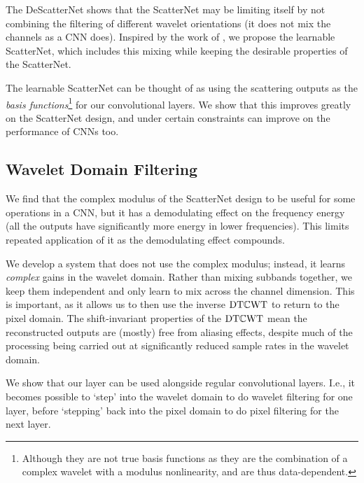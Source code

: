 The DeScatterNet shows that the ScatterNet may be limiting itself by not
combining the filtering of different wavelet orientations (it does not mix the
channels as a CNN does). Inspired by the work of \cite{qiu_dcfnet:_2018}, we
propose the learnable ScatterNet, which includes this mixing while keeping the
desirable properties of the ScatterNet.

The learnable ScatterNet can be thought of as using the scattering outputs as
the \emph{basis functions}\footnote{Although they are not true basis functions
as they are the combination of a complex wavelet with a modulus nonlinearity,
and are thus data-dependent.} for our convolutional layers. We show that this
improves greatly on the ScatterNet design, and under certain constraints can
improve on the performance of CNNs too.

\subsection{Wavelet Domain Filtering}
We find that the complex modulus of the ScatterNet design to be useful for some
operations in a CNN, but it has a demodulating effect on the frequency energy
(all the outputs have significantly more energy in lower frequencies). This
limits repeated application of it as the demodulating effect compounds.

We develop a system that does not use the complex modulus; instead, it
learns \emph{complex} gains in the wavelet domain.
Rather than mixing subbands together, we keep them independent and only learn to
mix across the channel dimension. This is important, as it allows us to then use the inverse
$\mathrm{DT}\mathbb{C}\mathrm{WT}$ to return to the pixel domain. The shift-invariant properties of the $\mathrm{DT}\mathbb{C}\mathrm{WT}$ mean the
reconstructed outputs are (mostly) free from aliasing effects, despite much of
the processing being carried out at significantly reduced sample rates in the
wavelet domain.

We show that our layer can be used alongside regular convolutional
layers. I.e., it becomes possible to `step' into the wavelet domain to do
wavelet filtering for one layer, before `stepping' back into the pixel domain to
do pixel filtering for the next layer.

